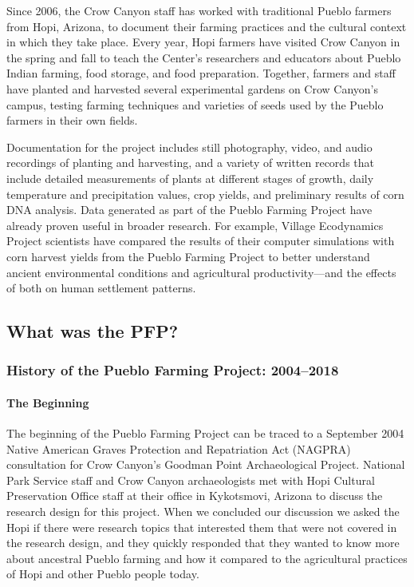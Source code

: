\documentclass[12pt,]{article}
\let\oldparagraph\paragraph
\renewcommand{\paragraph}[1]{\oldparagraph{#1}\mbox{}}
\begin{document}
Since 2006, the Crow Canyon staff has worked with traditional Pueblo farmers from Hopi, Arizona, to document their farming practices and the cultural context in which they take place. Every year, Hopi farmers have visited Crow Canyon in the spring and fall to teach the Center's researchers and educators about Pueblo Indian farming, food storage, and food preparation. Together, farmers and staff have planted and harvested several experimental gardens on Crow Canyon's campus, testing farming techniques and varieties of seeds used by the Pueblo farmers in their own fields.

Documentation for the project includes still photography, video, and audio recordings of planting and harvesting, and a variety of written records that include detailed measurements of plants at different stages of growth, daily temperature and precipitation values, crop yields, and preliminary results of corn DNA analysis. Data generated as part of the Pueblo Farming Project have already proven useful in broader research. For example, Village Ecodynamics Project scientists have compared the results of their computer simulations with corn harvest yields from the Pueblo Farming Project to better understand ancient environmental conditions and agricultural productivity---and the effects of both on human settlement patterns.

\hypertarget{what-was-the-pfp}{%
\subsection{What was the PFP?}\label{what-was-the-pfp}}

\hypertarget{history-of-the-pueblo-farming-project-20042018}{%
\subsubsection*{History of the Pueblo Farming Project: 2004--2018}\label{history-of-the-pueblo-farming-project-20042018}}

\hypertarget{the-beginning}{%
\paragraph{The Beginning}\label{the-beginning}}

The beginning of the Pueblo Farming Project can be traced to a September 2004 Native American Graves Protection and Repatriation Act (NAGPRA) consultation for Crow Canyon's Goodman Point Archaeological Project. National Park Service staff and Crow Canyon archaeologists met with Hopi Cultural Preservation Office staff at their office in Kykotsmovi, Arizona to discuss the research design for this project. When we concluded our discussion we asked the Hopi if there were research topics that interested them that were not covered in the research design, and they quickly responded that they wanted to know more about ancestral Pueblo farming and how it compared to the agricultural practices of Hopi and other Pueblo people today.
\end{document}
